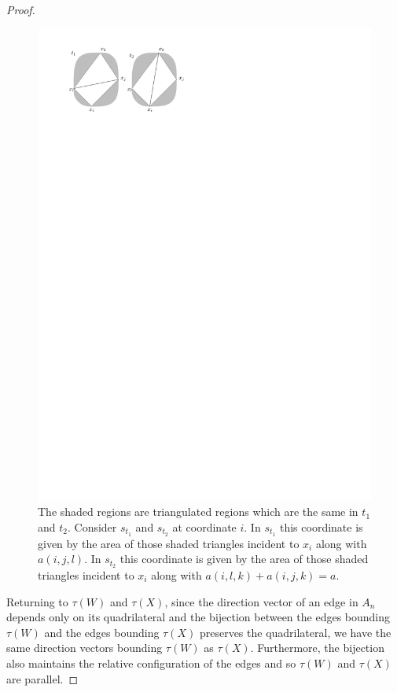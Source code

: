 \documentclass[11pt]{article}
\theoremstyle{remark}
\theoremstyle{definition}
\begin{document}
\begin{proof}
\begin{figure}
\includegraphics{triangulate} 
\caption{The shaded regions are triangulated regions which are the same in $t_1$ and $t_2$.  Consider $s_{t_1}$ and $s_{t_2}$ at coordinate $i$.  In $s_{t_1}$ this coordinate is given by the area of those shaded triangles incident to $x_i$ along with $a(i,j,l)$.  In $s_{t_2}$ this coordinate is given by the area of those shaded triangles incident to $x_i$ along with $a(i,l,k) + a(i,j,k) = a$.}\label{triangulate}
\end{figure}

  Returning to $\tau(W)$ and $\tau(X)$, since the direction vector of an edge in $A_n$ depends only on its quadrilateral and the bijection between the edges bounding $\tau(W)$ and the edges bounding $\tau(X)$ preserves the quadrilateral, we have the same direction vectors bounding $\tau(W)$ as $\tau(X)$.  Furthermore, the bijection also maintains the relative configuration of the edges and so $\tau(W)$ and $\tau(X)$ are parallel.
\end{proof}
\end{document}
